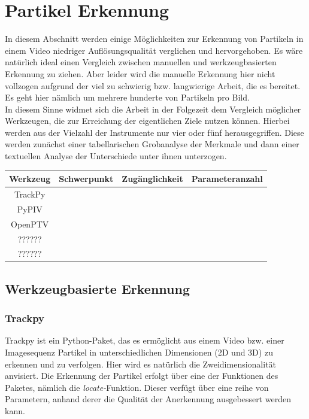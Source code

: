 \chapter{Partikel Erkennung}

In diesem  Abschnitt werden einige Möglichkeiten zur Erkennung von Partikeln in einem Video niedriger Auflösungsqualität verglichen und hervorgehoben. Es wäre natürlich ideal einen Vergleich zwischen manuellen und werkzeugbasierten Erkennung zu ziehen. Aber leider wird die manuelle Erkennung hier nicht vollzogen aufgrund der viel zu schwierig bzw. langwierige Arbeit, die es bereitet. Es geht hier nämlich um mehrere hunderte von Partikeln pro Bild. 
\\

In diesem Sinne widmet sich die Arbeit in der Folgezeit dem Vergleich möglicher Werkzeugen, die zur Erreichung der eigentlichen Ziele nutzen können. Hierbei werden aus der Vielzahl der Instrumente nur vier oder fünf herausgegriffen. Diese werden zunächst einer tabellarischen Grobanalyse der Merkmale und dann einer textuellen Analyse der Unterschiede unter ihnen unterzogen. \\


\begin{tabular}{|c||c|c|l|}
\hline
Werkzeug & Schwerpunkt & Zugänglichkeit & Parameteranzahl \\
\hline
\hline
 TrackPy & & & \\
 \hline
 PyPIV   & & & \\
 \hline
 OpenPTV & & & \\
 \hline
 ??????  & & & \\
 \hline
 ??????  & & & \\
 \hline
\end{tabular}




\section{Werkzeugbasierte Erkennung}

\subsection{Trackpy}
Trackpy ist ein Python-Paket, das es ermöglicht aus einem Video bzw. einer Imagesequenz Partikel in unterschiedlichen Dimensionen (2D und 3D) zu erkennen und zu verfolgen. Hier wird es natürlich die Zweidimensionalität anvisiert. Die Erkennung der Partikel erfolgt über eine der Funktionen des Paketes, nämlich die \textit{locate-}Funktion.
Dieser verfügt über eine reihe von Parametern, anhand derer die Qualität der Anerkennung ausgebessert werden kann.

